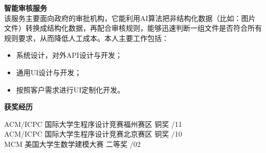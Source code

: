 \documentclass[a4paper]{article}
\newenvironment{changemargin}[2]{%
  \begin{list}{}{%
    \setlength{\topsep}{0pt}%
    \setlength{\leftmargin}{#1}%
    \setlength{\rightmargin}{#2}%
    \setlength{\listparindent}{\parindent}%
    \setlength{\itemindent}{\parindent}%
    \setlength{\parsep}{\parskip}%
  }%
  \item[]}{\end{list}
}
\newcommand{\lineover}{
	\begin{changemargin}{-0.05in}{-0.05in}
		\vspace*{-8pt}
		\hrulefill \\
		\vspace*{-2pt}
	\end{changemargin}
}
\newcommand{\header}[1]{
	\begin{changemargin}{-0.5in}{-0.5in}
	\fontsize{12}{14} \scshape{\textbf{#1}}\\
	\end{changemargin}
}
\newenvironment{body} {
	\vspace*{-16pt}
	\begin{changemargin}{-0.5in}{-0.5in}
  }	
	{\end{changemargin}
}
\begin{document}
\begin{body}
	\vspace{14pt}
  	\textbf{智能审核服务} \\
  	\smallskip
 	该服务主要面向政府的审批机构，它能利用AI算法把非结构化数据（比如：图片文件）转换成结构化数据，再配合审核规则，能够迅速判断一组文件是否符合所有规则要求，从而降低人工成本。本人主要工作包括：
	\vspace*{-2pt}
	\begin{itemize} \itemsep -0pt  %
		\item 系统设计，对外API设计与开发；\\
	\end{itemize}
	\vspace*{-10pt}
	\begin{itemize} \itemsep -0pt  %
		\item 通用UI设计与开发；\\
	\end{itemize}
	\vspace*{-10pt}
	\begin{itemize} \itemsep -0pt  %
		\item 按照客户需求进行UI定制化开发。\\
	\end{itemize}

\end{body}

\medskip

\header{获奖经历}
\begin{body}
	\vspace{14pt}
	{{\fontarial ACM/ICPC} 国际大学生程序设计竞赛福州赛区 铜奖} \hfill {/11}\\
	{{\fontarial ACM/ICPC} 国际大学生程序设计竞赛北京赛区 铜奖} \hfill {/10}\\
	{{\fontarial MCM} 美国大学生数学建模大赛 二等奖} \hfill {/02}\\
\end{body}

\medskip



	
\end{document}
